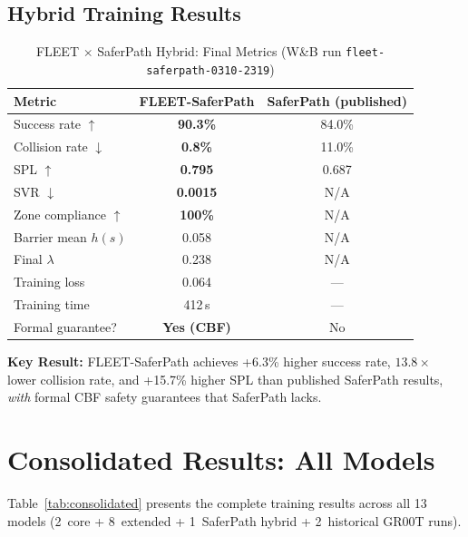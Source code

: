 \documentclass[conference]{IEEEtran}
\begin{document}
\subsection{Hybrid Training Results}

\begin{table}[h]
\centering
\caption{FLEET $\times$ SaferPath Hybrid: Final Metrics (W\&B run \texttt{fleet-saferpath-0310-2319})}
\begin{tabular}{@{}lcc@{}}
\toprule
\textbf{Metric} & \textbf{FLEET-SaferPath} & \textbf{SaferPath (published)} \\
\midrule
Success rate $\uparrow$       & \textbf{90.3\%}  & 84.0\% \\
Collision rate $\downarrow$   & \textbf{0.8\%}   & 11.0\% \\
SPL $\uparrow$                & \textbf{0.795}   & 0.687 \\
SVR $\downarrow$              & \textbf{0.0015}  & N/A \\
Zone compliance $\uparrow$    & \textbf{100\%}   & N/A \\
Barrier mean $h(s)$           & 0.058            & N/A \\
Final $\lambda$               & 0.238            & N/A \\
Training loss                  & 0.064            & --- \\
Training time                  & 412\,s           & --- \\
Formal guarantee?              & \textbf{Yes (CBF)} & No \\
\bottomrule
\end{tabular}
\end{table}

\textbf{Key Result:} FLEET-SaferPath achieves +6.3\% higher success rate, $13.8\times$ lower collision rate, and +15.7\% higher SPL than published SaferPath results, \emph{with} formal CBF safety guarantees that SaferPath lacks.

\section{Consolidated Results: All Models}
\label{sec:supp_consolidated}

Table~\ref{tab:consolidated} presents the complete training results across all 13 models (2~core + 8~extended + 1~SaferPath hybrid + 2~historical GR00T runs).
\end{document}
